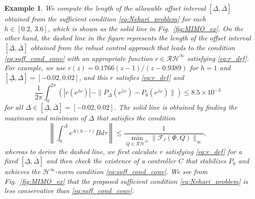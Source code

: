 \documentclass[letterpaper, 12pt, draftcls, onecolumn]{ieeeconf}
\newtheorem{example}[theorem]{Example}
\begin{document}
\begin{example}
We compute the length of the allowable offset interval $[\underline \Delta, \overline \Delta]$
obtained from the sufficient condition \eqref{eq:Nehari_problem} for each $h \in [0.2,~3.6]$,
which is shown as the solid line in Fig.~\ref{fig:MIMO_ex}.
On the other hand, the dashed line in the figure represents 
the length of the offset interval $[\underline \Delta, \overline \Delta]$
obtained from the robust control approach that leads to the condition
\eqref{eq:suff_cond_conv} with an appropriate function $r \in \mathcal{RH}^{\infty}$
satisfying \eqref{eq:r_def}.
For example, we use $r(z) = 0.1766(z-1)/(z-0.9389)$ for $h=1$ and $
[\underline \Delta, \overline \Delta] = 
[-0.02, 0.02]$, and this $r$ satisfies \eqref{eq:r_def} and
\[
\frac{1}{2\pi} \int_{0}^{2\pi} 
\left(
|r(e^{j\omega})| - \|P_{\Delta}(e^{j\omega}) - P_{0}(e^{j\omega}) \| 
\right)
\leq 8.5 \times 10^{-3}
\]
for all $\Delta \in  [\underline \Delta, \overline \Delta] = 
[-0.02, 0.02]$.
The solid line is obtained by finding the maximum and minimum of
$\Delta$ that satisfies
the condition
\begin{equation*}
\left\|\int^{\Delta}_0
e^{A(h-\tau)}B d\tau\right\| \leq
\frac{1}{\min_{Q\in \mathcal{RH}^{\infty}} \|\mathcal{F}_{\ell} (\Phi,Q)\|_{\infty}},
\end{equation*}
whereas to derive the dashed line, we first calculate $r$ satisfying
\eqref{eq:r_def} for a fixed $[\underline \Delta, \overline \Delta]$ and
then check the existence of a controller $C$ that stabilizes $P_0$ and achieves the
$\mathcal{H}^{\infty}$-norm condition \eqref{eq:suff_cond_conv}.
We see from Fig.~\ref{fig:MIMO_ex}
that the proposed sufficient condition \eqref{eq:Nehari_problem} 
is less conservative
than \eqref{eq:suff_cond_conv}.


\end{example}
\end{document}

